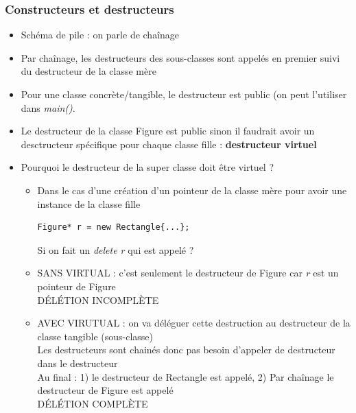\documentclass[12pt,a4paper]{article}
\begin{document}
\subsubsection{Constructeurs et destructeurs}
\begin{itemize}
\item Schéma de pile : on parle de chaînage
\item Par chaînage, les destructeurs des sous-classes sont appelés en premier suivi du destructeur de la classe mère
\item Pour une classe concrète/tangible, le destructeur est public (on peut l'utiliser dans \textit{main()}.
\item Le destructeur de la classe Figure est public sinon il faudrait avoir un desctructeur spécifique pour chaque classe fille : \textbf{destructeur virtuel}
\item Pourquoi le destructeur de la super classe doit être virtuel ?
\begin{itemize}
\item Dans le cas d'une création d'un pointeur de la classe mère pour avoir une instance de la classe fille
\begin{lstlisting}
Figure* r = new Rectangle{...};
\end{lstlisting}
Si on fait un \textit{delete r} qui est appelé ?
\item SANS VIRTUAL : c'est seulement le destructeur de Figure car \textit{r} est un pointeur de Figure\\
DÉLÉTION INCOMPLÈTE
\item AVEC VIRUTUAL : on va déléguer cette destruction au destructeur de la classe tangible (sous-classe)\\
Les destructeurs sont chainés donc pas besoin d'appeler de destructeur dans le destructeur\\
Au final : 1) le destructeur de Rectangle est appelé, 2) Par chaînage le destructeur de Figure est appelé\\
DÉLÉTION COMPLÈTE

\end{itemize}
\end{itemize}
\end{document}
